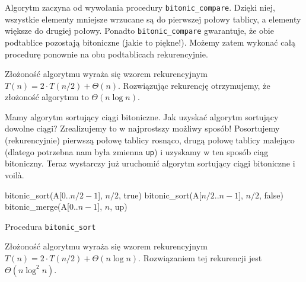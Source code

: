 Algorytm zaczyna od wywołania procedury \texttt{bitonic\_compare}.
Dzięki niej, wszystkie elementy mniejsze wrzucane są do pierwszej połowy tablicy, a elementy większe do drugiej połowy.
Ponadto \texttt{bitonic\_compare} gwarantuje, że obie podtablice pozostają bitoniczne (jakie to piękne!).
Możemy zatem wykonać całą procedurę ponownie na obu podtablicach rekurencyjnie.

Złożoność algorytmu wyraża się wzorem rekurencyjnym $T(n) = 2 \cdot T(n/2) + \Theta(n)$.
Rozwiązując rekurencję otrzymujemy, że złożoność algorytmu to $\Theta(n \log n)$.

Mamy algorytm sortujący ciągi bitoniczne.
Jak uzyskać algorytm sortujący dowolne ciągi?
Zrealizujemy to w najprostszy możliwy sposób!
Posortujemy (rekurencyjnie) pierwszą połowę tablicy rosnąco, drugą połowę tablicy malejąco (dlatego potrzebna nam była zmienna \texttt{up}) i uzyskamy w ten sposób ciąg bitoniczny.
Teraz wystarczy już uruchomić algorytm sortujący ciągi bitoniczne i voilà.

\begin{algorithm}[h]
  \DontPrintSemicolon
  
  
  
   {
     bitonic\_sort(A[$0$..$n/2-1$], $n/2$, true)\;
     bitonic\_sort(A[$n/2$..$n-1$], $n/2$, false)\;
     bitonic\_merge(A[$0$..$n-1$], $n$, up)\;
   }
  \caption{Procedura \texttt{bitonic\_sort}}
  \label{bitonic-sort}
\end{algorithm}

Złożoność algorytmu wyraża się wzorem rekurencyjnym $T(n) = 2 \cdot T(n/2) + \Theta(n \log n)$.
Rozwiązaniem tej rekurencji jest $\Theta(n \log^2 n)$.